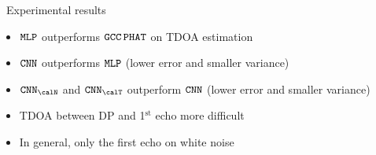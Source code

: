 \begin{frame}{\faFlask~Experimental results \hfill\faProjectDiagram}
    \vspace{-3mm}

    \vspace{-2mm}
    \begin{itemize}\small
        \item<2->[\cmark] $\mathtt{MLP}$ outperforms $\mathtt{GCC}\,\mathtt{PHAT}$ on TDOA estimation
        \item<3->[\cmark] $\mathtt{CNN}$ outperforms $\mathtt{MLP}$ (lower error and smaller variance)
        \item<4->[\cmark] $\CNNn$ and $\CNNt$ outperform $\mathtt{CNN}$ (lower error and smaller variance)
        \item<4->[\xmark] TDOA between DP and 1$^\text{st}$ echo more difficult
        \item<5->[\xmark] In general, only the first echo on white noise
    \end{itemize}

\end{frame}


\subsection{\blaster}

